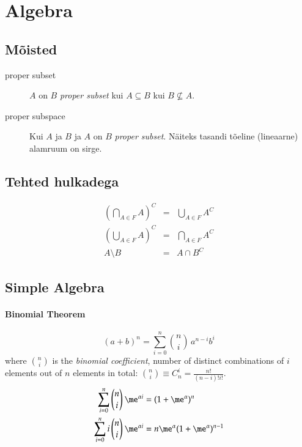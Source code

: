 \documentclass[a4paper]{article}
\numberwithin{equation}{subsection}
\begin{document}
\newpage
{}
\section{Algebra}

\subsection{Mõisted}
\label{sec:algebra_mqisted}

\begin{description}
\item[proper subset] $A$ on $B$ \emph{proper subset} kui $A\subseteq
  B$ kui $B \not\subseteq A$.
\item[proper subspace] Kui $A$ ja $B$ ja $A$ on $B$ \emph{proper
    subset}.  Näiteks tasandi tõeline (lineaarne) alamruum on sirge.
\end{description}

\subsection{Tehted hulkadega}
\begin{eqnarray}
\left( \bigcap_{A \in F} A \right)^C & = &
  \bigcup_{A \in F} A^C\\
%
\left( \bigcup_{A \in F} A \right)^C & = &
  \bigcap_{A \in F} A^C\\
%
A \setminus B & = & A \cap B^C
\end{eqnarray}

\subsection{Simple Algebra}

\paragraph{Binomial Theorem}
\begin{equation}
(a+b)^n = \sum^n_{i=0} \binom{n}{i} \, a^{n-i} b^i
\end{equation}
where $\binom{n}{i}$ is the \emph{binomial coefficient}, number of
distinct combinations of $i$ elements out of $n$ elements in total:
$\binom{n}{i} \equiv C_n^i = \frac{n!}{(n-i)! i!}$.
\begin{align}
  \sum_{i=0}^{n} \binom{n}{i}\: \me^{\alpha i}
  &=
  (1 + \me^{\alpha})^{n}
  \\
  \sum_{i=0}^{n} i \, \binom{n}{i}\: \me^{\alpha i}
  &=
  n \me^{\alpha}(1 + \me^{\alpha})^{n-1}
\end{align}
\end{document}
